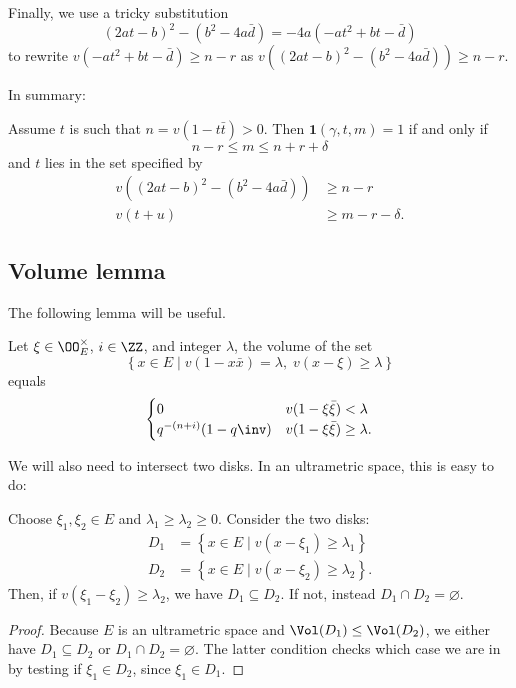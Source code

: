 Finally, we use a tricky substitution
\[ (2at-b)^2 - (b^2-4a\bar d) = -4a(-at^2+bt-\bar d) \]
to rewrite $v(-at^2+bt-\bar d) \geq n-r$
as $v\left( (2at-b)^2 - (b^2-4a\bar d) \right) \geq n-r$.

In summary:
\begin{claim}
  Assume $t$ is such that $n = v(1-t \bar t) > 0$.
  Then $\mathbf{1}(\gamma, t, m) = 1$ if and only if
  \[ n - r \leq m \leq n + r + \delta \]
  and $t$ lies in the set specified by
  \begin{align*}
    v\left( (2at-b)^2 - (b^2-4a\bar d) \right) &\geq n-r \\
    v(t+u) &\ge m-r-\delta.
  \end{align*}
\end{claim}

\subsection{Volume lemma}
The following lemma will be useful.
\begin{lemma}
  Let $\xi \in \OO_E^\times$, $i \in \ZZ$, and integer $\lambda$,
  the volume of the set
  \[ \left\{ x \in E \mid v(1-x \bar x) = \lambda, \; v(x-\xi) \ge \lambda \right\} \]
  equals
  \[
    \begin{cases}
      0 & v(1-\xi\bar\xi) < \lambda \\
      q^{-(n+i)}(1-q\inv) & v(1-\xi\bar\xi) \ge \lambda.
    \end{cases}
  \]
\end{lemma}

We will also need to intersect two disks. In an ultrametric space, this is easy to do:
\begin{lemma}
  Choose $\xi_1, \xi_2 \in E$ and $\lambda_1 \geq \lambda_2 \geq 0$.
  Consider the two disks:
  \begin{align*}
    D_1 &= \left\{ x \in E \mid v(x-\xi_1) \ge \lambda_1 \right\} \\
    D_2 &= \left\{ x \in E \mid v(x-\xi_2) \ge \lambda_2 \right\}.
  \end{align*}
  Then, if $v(\xi_1-\xi_2) \geq \lambda_2$, we have $D_1 \subseteq D_2$.
  If not, instead $D_1 \cap D_2 = \varnothing$.
  \label{lem:mastercard}
\end{lemma}
\begin{proof}
  Because $E$ is an ultrametric space and $\Vol(D_1) \leq \Vol(D_2)$,
  we either have $D_1 \subseteq D_2$ or $D_1 \cap D_2 = \varnothing$.
  The latter condition checks which case we are in by testing if $\xi_1 \in D_2$,
  since $\xi_1 \in D_1$.
\end{proof}

